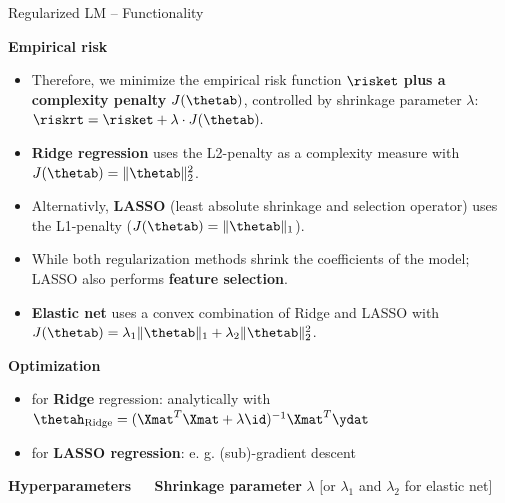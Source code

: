 \documentclass[11pt,compress,t,notes=noshow, xcolor=table]{beamer}
\newcommand{\highlight}[1]{\textcolor{highlightcol}{\textbf{#1}}}
\begin{document}

\begin{frame}{Regularized LM -- Functionality}

\footnotesize

\highlight{Empirical risk}

\begin{itemize}

\item Therefore, we minimize the empirical risk function $\risket$ \textbf{plus a complexity penalty} $J(\thetab)$, controlled by shrinkage parameter $\lambda$:
  $
  \riskrt = \risket + \lambda \cdot J(\thetab). 
  $ 
  
\item \textbf{Ridge regression} uses the L2-penalty as a complexity measure with $J(\thetab) = \|\thetab\|_2^2 $. 

\item Alternativly, \textbf{LASSO} (least absolute shrinkage and selection operator) uses the L1-penalty ($J(\thetab) = \|\thetab\|_1 $).

\item While both regularization methods shrink the coefficients of the model; LASSO also performs \textbf{feature selection}. 

\item \textbf{Elastic net} uses a convex combination of Ridge and LASSO with $J(\thetab) = \lambda_1 \|\thetab\|_1 + \lambda_2 \|\thetab\|_2^2$.
  
  
\end{itemize}





\medskip

\highlight{Optimization} ~~
\begin{itemize}\footnotesize
  \item for \textbf{Ridge} regression: analytically with $\thetah_{\text{Ridge}} = (\Xmat^T \Xmat  + \lambda \id)^{-1} \Xmat^T\ydat$
  \item for \textbf{LASSO regression}: e. g. (sub)-gradient descent
\end{itemize}

\medskip

\highlight{Hyperparameters} ~~ \textbf{Shrinkage parameter} $\lambda$ [or $\lambda_1$ and $\lambda_2$ for elastic net] \\

\medskip


\end{frame}
\end{document}
